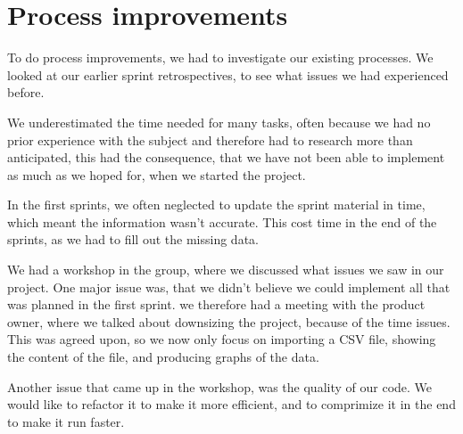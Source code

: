 \section{Process improvements} %
\label{sec:improvements}
To do process improvements, we had to investigate our existing processes. We looked at our earlier sprint retrospectives, to see what issues we had experienced before. 

\item We underestimated the time needed for many tasks, often because we had no prior experience with the subject and therefore had to research more than anticipated, this had the consequence, that we have not been able to implement as much as we hoped for, when we started the project.
\item In the first sprints, we often neglected to update the sprint material in time, which meant the information wasn't accurate. This cost time in the end of the sprints, as we had to fill out the missing data.

We had a workshop in the group, where we discussed what issues we saw in our project. One major issue was, that we didn't believe we could implement all that was planned in the first sprint. 
we therefore had a meeting with the product owner, where we talked about downsizing the project, because of the time issues. This was agreed upon, so we now only focus on importing a CSV file, showing the content of the file, and producing graphs of the data.

Another issue that came up in the workshop, was the quality of our code. We would like to refactor it to make it more efficient, and to comprimize it in the end to make it run faster.

